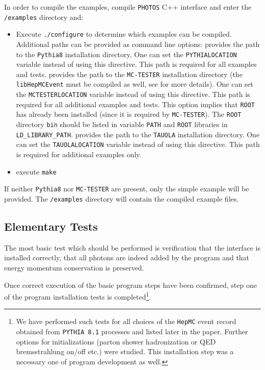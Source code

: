 \documentclass[]{Photos_interface_design}
\begin{document}
In order to compile the examples, compile {\tt PHOTOS} C++ interface and enter the {\tt /examples} directory and:
\begin{itemize}
  \item Execute {\tt ./configure} to determine which examples can be compiled.
        Additional paths can be provided as command line options:
    provides the path to the {\tt Pythia8} installation
            directory. One can set the {\tt PYTHIALOCATION} variable instead of using this directive.
            This path is required for all examples and tests.
    provides the path to the {\tt MC-TESTER} installation
            directory (the {\tt libHepMCEvent} must be compiled as well, see \cite{Davidson:2008ma}
			for more details). One can set the {\tt MCTESTERLOCATION} variable instead of using this
			directive. This path is required for all additional examples and tests.  This option
			implies that {\tt ROOT} has already been installed (since it is required by {\tt MC-TESTER}).
			The {\tt ROOT} directory {\tt bin} should be listed in variable {\tt PATH} and {\tt ROOT}
			libraries in {\tt LD\_LIBRARY\_PATH}.
    provides the path to the {\tt TAUOLA} installation directory.
            One can set the {\tt TAUOLALOCATION} variable instead of using this directive.
			This path is required for additional examples only.
  \item execute {\tt make}
\end{itemize}

If neither {\tt Pythia8} nor {\tt MC-TESTER} are present, only the simple example will be provided. The {\tt /examples} directory will contain the compiled example files.

\subsection{Elementary Tests}
\label{sect:elem}
The most basic test which should be performed is verification that the interface is installed correctly, that all
photons are indeed added by the program and that energy momentum conservation is preserved.

Once correct execution of the basic program steps have been confirmed,
step one of the program installation tests  is completed\footnote{
We have  performed such  tests for all choices of the {\tt HepMC} event record obtained 
from  {\tt PYTHIA 8.1} processes and 
listed later in the paper. Further  options for initializations 
(parton shower hadronization or QED bremsstrahlung on/off etc.) were studied.
This installation step  was a necessary one of program development as well.}.
\end{document}
